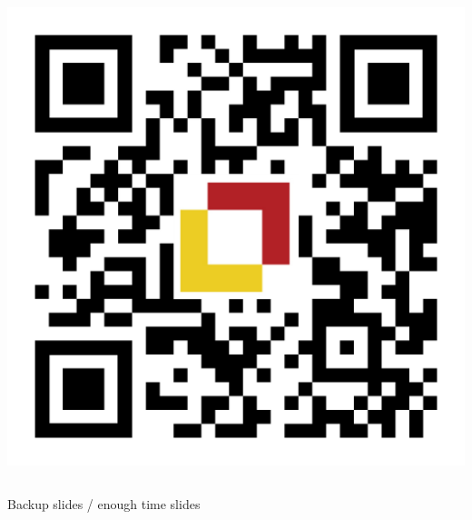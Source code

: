 \documentclass[aspectratio=169]{beamer}
\begin{document}
\begin{frame}
\begin{columns}
    \begin{column}{0.25\textwidth}
	\begin{center}	
		\bigskip
		\includegraphics[scale=0.1]{assets/qr-code.pdf}
	\end{center}
    \end{column}
\end{columns}

\end{frame}

\begin{frame}
Backup slides / enough time slides
\end{frame}
\end{document}

